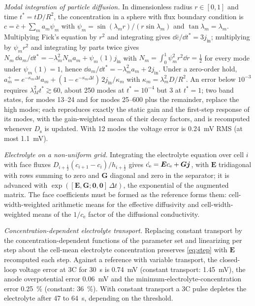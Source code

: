 \documentclass[journal]{IEEEtran}
\newcommand{\ce}{c_{\mathrm{e}}}\newcommand{\Ds}{D_{\mathrm{s}}}\newcommand{\Rf}{R_{\mathrm{f}}}
\begin{document}
\emph{Modal integration of particle diffusion.} In dimensionless radius $r\in[0,1]$ and time $t^{*}=tD/R^2$, the concentration in a sphere with flux boundary condition is $c=\bar c+\sum_m a_m\psi_m$ with $\psi_m=\sin(\lambda_m r)/(r\sin\lambda_m)$ and $\tan\lambda_m=\lambda_m$. Multiplying Fick's equation by $r^2$ and integrating gives $\dd\bar c/\dd t^{*}=3j_{\mathrm{in}}$; multiplying by $\psi_m r^2$ and integrating by parts twice gives $N_m\,\dd a_m/\dd t^{*}=-\lambda_m^2N_ma_m+\psi_m(1)j_{\mathrm{in}}$ with $N_m=\int_0^1\psi_m^2r^2\dd r=\tfrac12$ for every mode under $\psi_m(1)=1$, hence $\dd a_m/\dd t^{*}=-\lambda_m^2a_m+2j_{\mathrm{in}}$. Under a zero-order hold, $a_m^{+}=e^{-\kappa_m\Delta t}a_m+(1-e^{-\kappa_m\Delta t})\,2j_{\mathrm{in}}/\kappa_m$ with $\kappa_m=\lambda_m^2D/R^2$. An error below $10^{-3}$ requires $\lambda_M^2t^{*}\gtrsim60$, about 250 modes at $t^{*}=10^{-4}$ but 3 at $t^{*}=1$; two band states, for modes 13--24 and for modes 25--600 plus the remainder, replace the high modes; each reproduces exactly the static gain and the first-step response of its modes, with the gain-weighted mean of their decay factors, and is recomputed whenever $\Ds$ is updated. With 12 modes the voltage error is \SI{0.24}{\milli\volt} RMS (at most \SI{1.1}{\milli\volt}).

\emph{Electrolyte on a non-uniform grid.} Integrating the electrolyte equation over cell $i$ with face fluxes $D_{i+\frac12}(c_{i+1}-c_i)/h_{i+\frac12}$ gives $\dot{\ce}=\bm E\ce+\bm G\vj$, with $\bm E$ tridiagonal with rows summing to zero and $\bm G$ diagonal and zero in the separator; it is advanced with $\exp([\bm E,\bm G;\bm 0,\bm 0]\,\Delta t)$, the exponential of the augmented matrix. The face coefficients must be formed as the reference forms them: cell-width-weighted arithmetic means for the effective diffusivity and cell-width-weighted means of the $1/\ce$ factor of the diffusional conductivity.

\emph{Concentration-dependent electrolyte transport.} Replacing constant transport by the concentration-dependent functions of the parameter set\cite{chen2020} and linearizing per step about the cell-mean electrolyte concentration preserves \eqref{eq:step} with $\bm E$ recomputed each step. Against a reference with variable transport, the closed-loop voltage error at 3C for \SI{30}{\second} is \SI{0.74}{\milli\volt} (constant transport: \SI{1.45}{\milli\volt}), the anode overpotential error \SI{0.06}{\milli\volt} and the minimum-electrolyte-concentration error \SI{0.25}{\percent} (constant: \SI{36}{\percent}). With constant transport a 3C pulse depletes the electrolyte after 47 to \SI{64}{\second}, depending on the threshold.
\end{document}
